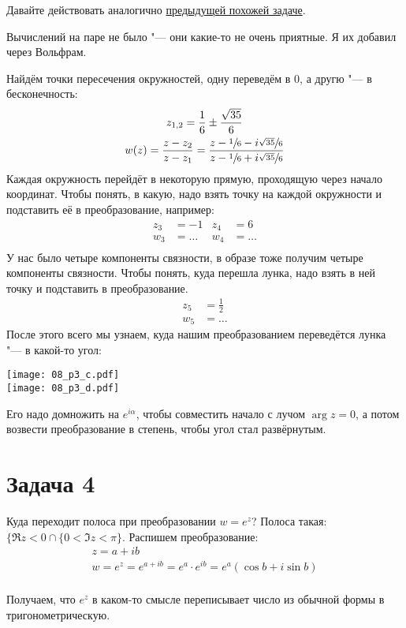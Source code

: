 	Давайте действовать аналогично \hyperref[day150331_task5]{предыдущей похожей задаче}.
	\begin{Rem}
		Вычислений на паре не было "--- они какие-то не очень приятные.
		Я их добавил через Вольфрам.
	\end{Rem}
	Найдём точки пересечения окружностей, одну переведём в 0, а другю "--- в бесконечность:
	\begin{gather*}
		z_{1,2} = \frac 16 \pm \frac{\sqrt{35}}{6} \\
		w(z) = \frac{z-z_2}{z-z_1} = \frac{z - \sfrac 16 - i\sfrac{\sqrt{35}}6}{z-\sfrac 16 + i\sfrac{\sqrt{35}}6}
	\end{gather*}
	Каждая окружность перейдёт в некоторую прямую, проходящую через начало координат.
	Чтобы понять, в какую, надо взять точку на каждой окружности и подставить её в преобразование,
	например:
	\begin{align*}
		z_3 &= -1 & z_4 &= 6 \\
		w_3 &= \dots & w_4 &= \dots \\
	\end{align*}
	У нас было четыре компоненты связности, в образе тоже получим четыре компоненты связности.
	Чтобы понять, куда перешла лунка, надо взять в ней точку и подставить в преобразование.
	\begin{align*}
		z_5 &= \frac 1 2 \\
		w_5 &= \dots
	\end{align*}
	После этого всего мы узнаем, куда нашим преобразованием переведётся лунка "--- в какой-то угол:

	\begin{center}
		\texttt{[image: 08\_p3\_c.pdf]} \\
		\texttt{[image: 08\_p3\_d.pdf]}
	\end{center}

	Его надо домножить на $e^{i\alpha}$, чтобы совместить начало с лучом $\arg z = 0$,
	а потом возвести преобразование в степень, чтобы угол стал развёрнутым.

\section{Задача 4}
	Куда переходит полоса при преобразовании $w=e^z$?
	Полоса такая: $\{ \Re z < 0 \cap \{ 0 < \Im z < \pi\}$.
	Распишем преобразование: 
	\begin{gather*}
		z = a + ib \\
		w=e^z=e^{a+ib}=e^a\cdot e^{ib} = e^a (\cos b + i\sin b)\\
	\end{gather*}
	\begin{center}
	\end{center}
	Получаем, что $e^z$ в каком-то смысле переписывает число из обычной формы в тригонометрическую.


